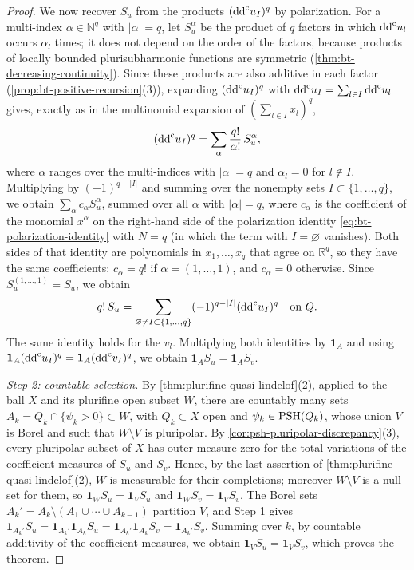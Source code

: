 \begin{proof}
We now recover $S_u$ from the products $(\mathrm{dd}^{\mathrm{c}} u_I)^q$ by polarization. For a multi-index $\alpha\in\mathbb N^q$ with $|\alpha|=q$, let $S_u^\alpha$ be the product of $q$ factors in which $\mathrm{dd}^{\mathrm{c}} u_l$ occurs $\alpha_l$ times; it does not depend on the order of the factors, because products of locally bounded plurisubharmonic functions are symmetric (\cref{thm:bt-decreasing-continuity}). Since these products are also additive in each factor (\cref{prop:bt-positive-recursion}(3)), expanding $(\mathrm{dd}^{\mathrm{c}} u_I)^q$ with $\mathrm{dd}^{\mathrm{c}} u_I=\sum_{l\in I}\mathrm{dd}^{\mathrm{c}} u_l$ gives, exactly as in the multinomial expansion of $(\sum_{l\in I}x_l)^q$,
\[
 (\mathrm{dd}^{\mathrm{c}} u_I)^q=\sum_\alpha\frac{q!}{\alpha!}\,S_u^\alpha,
\]
where $\alpha$ ranges over the multi-indices with $|\alpha|=q$ and $\alpha_l=0$ for $l\notin I$. Multiplying by $(-1)^{q-|I|}$ and summing over the nonempty sets $I\subset\{1,\ldots,q\}$, we obtain $\sum_\alpha c_\alpha S_u^\alpha$, summed over all $\alpha$ with $|\alpha|=q$, where $c_\alpha$ is the coefficient of the monomial $x^\alpha$ on the right-hand side of the polarization identity \eqref{eq:bt-polarization-identity} with $N=q$ (in which the term with $I=\varnothing$ vanishes). Both sides of that identity are polynomials in $x_1,\ldots,x_q$ that agree on $\mathbb R^q$, so they have the same coefficients: $c_\alpha=q!$ if $\alpha=(1,\ldots,1)$, and $c_\alpha=0$ otherwise. Since $S_u^{(1,\ldots,1)}=S_u$, we obtain
\[
 q!\,S_u=\sum_{\varnothing\ne I\subset\{1,\ldots,q\}}(-1)^{q-|I|}(\mathrm{dd}^{\mathrm{c}} u_I)^q
 \quad\text{on }Q.
\]
The same identity holds for the $v_l$. Multiplying both identities by $\mathbf1_A$ and using $\mathbf1_A(\mathrm{dd}^{\mathrm{c}} u_I)^q=\mathbf1_A(\mathrm{dd}^{\mathrm{c}} v_I)^q$, we obtain $\mathbf1_AS_u=\mathbf1_AS_v$.

\emph{Step 2: countable selection.} By \cref{thm:plurifine-quasi-lindelof}(2), applied to the ball $X$ and its plurifine open subset $W$, there are countably many sets $A_k=Q_k\cap\{\psi_k>0\}\subset W$, with $Q_k\subset X$ open and $\psi_k\in\mathrm{PSH}(Q_k)$, whose union $V$ is Borel and such that $W\setminus V$ is pluripolar. By \cref{cor:psh-pluripolar-discrepancy}(3), every pluripolar subset of $X$ has outer measure zero for the total variations of the coefficient measures of $S_u$ and $S_v$. Hence, by the last assertion of \cref{thm:plurifine-quasi-lindelof}(2), $W$ is measurable for their completions; moreover $W\setminus V$ is a null set for them, so $\mathbf1_WS_u=\mathbf1_VS_u$ and $\mathbf1_WS_v=\mathbf1_VS_v$. The Borel sets $A_k'=A_k\setminus(A_1\cup\cdots\cup A_{k-1})$ partition $V$, and Step 1 gives $\mathbf1_{A_k'}S_u=\mathbf1_{A_k'}\mathbf1_{A_k}S_u=\mathbf1_{A_k'}\mathbf1_{A_k}S_v=\mathbf1_{A_k'}S_v$. Summing over $k$, by countable additivity of the coefficient measures, we obtain $\mathbf1_VS_u=\mathbf1_VS_v$, which proves the theorem.
\end{proof}

